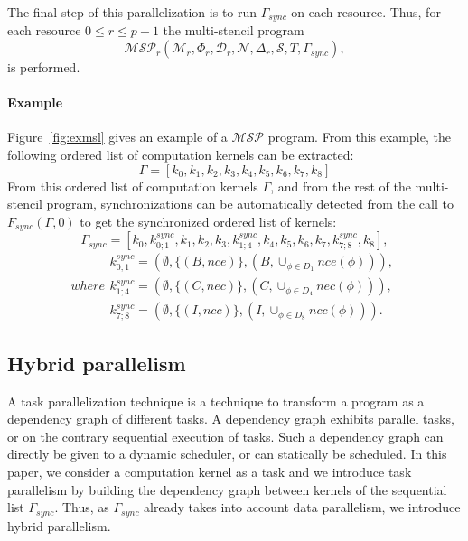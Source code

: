  The final step of this parallelization is to run $\Gamma_{sync}$ on each resource. Thus, for each resource $0 \leq r \leq p-1$ the multi-stencil program 
\begin{equation}
\mathcal{MSP}_r(\mathcal{M}_r,\Phi_r,\mathcal{D}_r,\mathcal{N},\Delta_r,\mathcal{S},T,\Gamma_{sync}),
\end{equation}
is performed.

\paragraph{\textbf{Example}} Figure~\ref{fig:exmsl} gives an example of a $\mathcal{MSP}$ program. From this example, the following ordered list of computation kernels can be extracted:
\begin{equation*}
\Gamma = [k_0,k_1,k_2,k_3,k_4,k_5,k_6,k_7,k_8]
\end{equation*}
From this ordered list of computation kernels $\Gamma$, and from the rest of the multi-stencil program, synchronizations can be automatically detected from the call to $F_{sync}(\Gamma,0)$ to get the synchronized ordered list of kernels:
\begin{equation}
\Gamma_{sync} = [k_0,k_{0;1}^{sync},k_1,k_2,k_3,k_{1;4}^{sync},k_4,k_5,k_6,k_7,k_{7;8}^{sync},k_8],
\label{eq:exsync}
\end{equation}
\begin{subequations}
where
\begin{align}
        k_{0;1}^{sync}=(\emptyset,\{(B,nce)\},(B,\cup_{\phi \in D_1} nce(\phi))),\\
        k_{1;4}^{sync}=(\emptyset,\{(C,nec)\},(C,\cup_{\phi \in D_4} nec(\phi))),\\
        k_{7;8}^{sync}=(\emptyset,\{(I,ncc)\},(I,\cup_{\phi \in D_8} ncc(\phi))).
\end{align}
\end{subequations}

\subsection{Hybrid parallelism}
A task parallelization technique is a technique to transform a program as a dependency graph of different tasks. A dependency graph exhibits parallel tasks, or on the contrary sequential execution of tasks. Such a dependency graph can directly be given to a dynamic scheduler, or can statically be scheduled. In this paper, we consider a computation kernel as a task and we introduce task parallelism by building the dependency graph between kernels of the sequential list $\Gamma_{sync}$. Thus, as $\Gamma_{sync}$ already takes into account data parallelism, we introduce hybrid parallelism.

